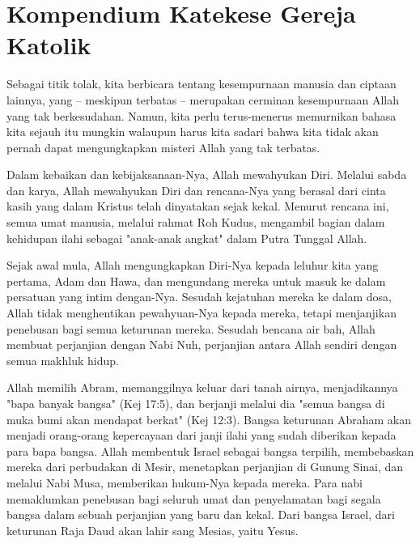 \newpage
\section*{Kompendium Katekese Gereja Katolik}
\setcounter{kgkcounter}{4}
{\small
{}
Sebagai titik tolak, kita berbicara tentang kesempurnaan manusia dan ciptaan
lainnya, yang -- meskipun terbatas -- merupakan cerminan kesempurnaan Allah
yang tak berkesudahan. Namun, kita perlu terus-menerus memurnikan bahasa kita
sejauh itu mungkin walaupun harus kita sadari bahwa kita tidak akan pernah dapat
mengungkapkan misteri Allah yang tak terbatas.

Dalam kebaikan dan kebijaksanaan-Nya, Allah mewahyukan Diri. Melalui
sabda dan karya, Allah mewahyukan Diri dan rencana-Nya yang berasal dari cinta kasih yang dalam Kristus telah dinyatakan sejak kekal. Menurut rencana ini,
semua umat manusia, melalui rahmat Roh Kudus, mengambil bagian dalam 
kehidupan ilahi sebagai "anak-anak angkat" dalam Putra Tunggal Allah.

Sejak awal mula, Allah mengungkapkan Diri-Nya kepada leluhur kita yang
pertama, Adam dan Hawa, dan mengundang mereka untuk masuk ke dalam
persatuan yang intim dengan-Nya. Sesudah kejatuhan mereka ke dalam dosa, Allah
tidak menghentikan pewahyuan-Nya kepada mereka, tetapi menjanjikan penebusan
bagi semua keturunan mereka. Sesudah bencana air bah, Allah membuat perjanjian
dengan Nabi Nuh, perjanjian antara Allah sendiri dengan semua makhluk hidup.

Allah memilih Abram, memanggilnya keluar dari tanah airnya, menjadikannya
"bapa banyak bangsa" (Kej 17:5), dan berjanji melalui dia "semua bangsa di muka
bumi akan mendapat berkat" (Kej 12:3). Bangsa keturunan Abraham akan menjadi
orang-orang kepercayaan dari janji ilahi yang sudah diberikan kepada para bapa
bangsa. Allah membentuk Israel sebagai bangsa terpilih, membebaskan mereka
dari perbudakan di Mesir, menetapkan perjanjian di Gunung Sinai, dan melalui
Nabi Musa, memberikan hukum-Nya kepada mereka. Para nabi memaklumkan
penebusan bagi seluruh umat dan penyelamatan bagi segala bangsa dalam sebuah
perjanjian yang baru dan kekal. Dari bangsa Israel, dari keturunan Raja Daud akan
lahir sang Mesias, yaitu Yesus.


}